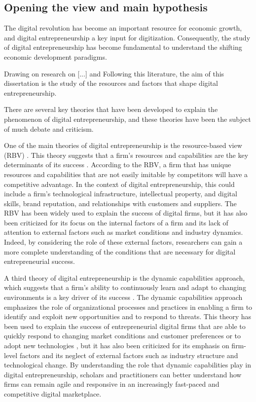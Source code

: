 \documentclass[12pt]{article}
\begin{document}
\subsection{Opening the view and main hypothesis}

The digital revolution has become an important resource for economic growth, and digital entrepreneurship a key input for digitization. Consequently, the study of digital entrepreneurship has become fundamental to understand the shifting economic development paradigms.

Drawing on research on [...] and Following this literature, the aim of this dissertation is the study of the resources and factors that shape digital entrepreneurship.






There are several key theories that have been developed to explain the phenomenon of digital entrepreneurship, and these theories have been the subject of much debate and criticism.

One of the main theories of digital entrepreneurship is the resource-based view (RBV) \citep{wernerfelt1984resource}. This theory suggests that a firm's resources and capabilities are the key determinants of its success \citep{giustiziero2021hyperspecialization}. According to the RBV, a firm that has unique resources and capabilities that are not easily imitable by competitors will have a competitive advantage. In the context of digital entrepreneurship, this could include a firm's technological infrastructure, intellectual property, and digital skills, brand reputation, and relationships with customers and suppliers. The RBV has been widely used to explain the success of digital firms, but it has also been criticized for its focus on the internal factors of a firm and its lack of attention to external factors such as market conditions and industry dynamics. Indeed, by considering the role of these external factors, researchers can gain a more complete understanding of the conditions that are necessary for digital entrepreneurial success.


A third theory of digital entrepreneurship is the dynamic capabilities approach, which suggests that a firm's ability to continuously learn and adapt to changing environments is a key driver of its success \citep{teece1997dynamic, eisenhardt2000dynamic}. The dynamic capabilities approach emphasizes the role of organizational processes and practices in enabling a firm to identify and exploit new opportunities and to respond to threats. This theory has been used to explain the success of entrepreneurial digital firms that are able to quickly respond to changing market conditions and customer preferences or to adopt new technologies \citep{martin2020and, zietsma2020scaling}, but it has also been criticized for its emphasis on firm-level factors and its neglect of external factors such as industry structure and technological change. By understanding the role that dynamic capabilities play in digital entrepreneurship, scholars and practitioners can better understand how firms can remain agile and responsive in an increasingly fast-paced and competitive digital marketplace.
\end{document}
